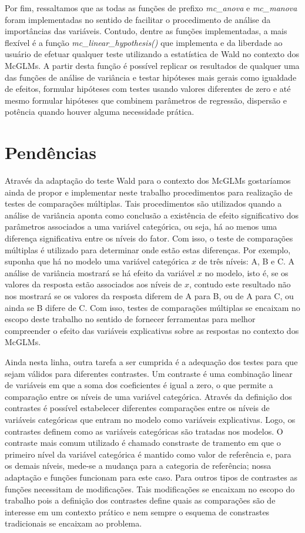 Por fim, ressaltamos que as todas as funções de prefixo \emph{mc\_anova} e \emph{mc\_manova} foram implementadas no sentido de facilitar o procedimento de análise da importâncias das variáveis. Contudo, dentre as funções implementadas, a mais flexível é a função \emph{mc\_linear\_hypothesis()} que implementa e da liberdade ao usuário de efetuar qualquer teste utilizando a estatística de Wald no contexto dos McGLMs. A partir desta função é possível replicar os resultados de qualquer uma das funções de análise de variância e testar hipóteses mais gerais como igualdade de efeitos, formular hipóteses com testes usando valores diferentes de zero e até mesmo formular hipóteses que combinem parâmetros de regressão, dispersão e potência quando houver alguma necessidade prática.

\section{Pendências}

Através da adaptação do teste Wald para o contexto dos McGLMs gostaríamos ainda de propor e implementar neste trabalho procedimentos para realização de testes de comparações múltiplas. Tais procedimentos são utilizados quando a análise de variância aponta como conclusão a existência de efeito significativo dos parâmetros associados a uma variável categórica, ou seja, há ao menos uma diferença significativa entre os níveis do fator. Com isso, o teste de comparações múltiplas é utilizado para determinar onde estão estas diferenças. Por exemplo, suponha que há no modelo uma variável categórica $x$ de três níveis: A, B e C. A análise de variância mostrará se há efeito da variável $x$ no modelo, isto é, se os valores da resposta estão associados aos níveis de $x$, contudo este resultado não nos mostrará se os valores da resposta diferem de A para B, ou de A para C, ou ainda se B difere de C. Com isso, testes de comparações múltiplas se encaixam no escopo deste trabalho no sentido de fornecer ferramentas para melhor compreender o efeito das variáveis explicativas sobre as respostas no contexto dos McGLMs.

Ainda nesta linha, outra tarefa a ser cumprida é a adequação dos testes para que sejam válidos para diferentes contrastes. Um contraste é uma combinação linear de variáveis em que a soma dos coeficientes é igual a zero, o que permite a comparação entre os níveis de uma variável categórica. Através da definição dos contrastes é possível estabelecer diferentes comparações entre os níveis de variáveis categóricas que entram no modelo como variáveis explicativas. Logo, os contrastes definem como as variáveis categóricas são tratadas nos modelos. O contraste mais comum utilizado é chamado constraste de tramento em que o primeiro nível da variável categórica é mantido como valor de referência e, para os demais níveis, mede-se a mudança para a categoria de referência; nossa adaptação e funções funcionam para este caso. Para outros tipos de contrastes as funções necessitam de modificações. Tais modificações se encaixam no escopo do trabalho pois a definição dos contrastes define quais as comparações são de interesse em um contexto prático e nem sempre o esquema de constrastes tradicionais se encaixam ao problema.

